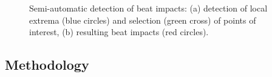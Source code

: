 \begin{figure}%
	\begin{center}
	\end{center}
	\vspace{-0.6cm}
	\caption[Semi-automatic detection of beat impacts]{Semi-automatic detection of beat impacts: (a) detection of local extrema (blue circles) and selection (green cross) of points of interest, (b) resulting beat impacts (red circles).}
	\label{fig:beatDetection}
\end{figure}
		

		\subsection{Methodology}
		\label{subsec:Analysis_TimpaniAnalysis_Methodo}

